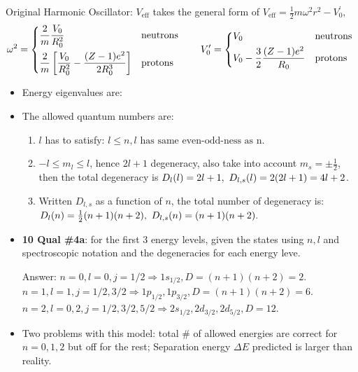 \documentclass{school-22.101-notes}
\begin{document}
Original Harmonic Oscillator: $V_{\mathrm{eff}}$ takes the general form of $V_{\mathrm{eff}} = \frac{1}{2} m \omega^2 r^2 - V_0^{\prime},$ 
  \begin{align}
    \omega^2 =
    \begin{dcases*}
      \frac{2}{m} \frac{V_0}{R_0^2}  & neutrons \\
      \frac{2}{m} \left[ \frac{V_0}{R_0^2} - \frac{(Z-1) e^2}{2 R_0^3} \right] & protons \\
    \end{dcases*}
    \fsp \fsp \fsp \fsp \fsp
    V_0^{\prime} = 
    \begin{dcases*}
      V_0 & neutrons \\
      V_0 - \frac{3}{2} \frac{(Z-1) e^2}{R_0} & protons \\
    \end{dcases*}
  \end{align}
\begin{itemize}
\item Energy eigenvalues are: 

\item The allowed quantum numbers are: 
  \begin{enumerate}
  \item $l$ has to satisfy: $\boxed{l \le n, l \mbox{ has same even-odd-ness as n.}}$
  \item $-l \le m_l \le l$, hence $2l+1$ degeneracy, also take into account $m_s = \pm \frac{1}{2}$, then the total degeneracy is $ D_l (l) = 2l+1, \mbox{ } D_{l,s} (l) = 2(2l+1) = 4l+2$.
  \item Written $D_{l,s}$ as a function of $n$, the total number of degeneracy is: 
    $ D_l (n) = \frac{1}{2} (n+1)(n+2), \mbox{ } D_{l,s} (n) = (n+1)(n+2).$
  \end{enumerate}
  
\item \textbf{10 Qual \#4a}: for the first 3 energy levels, given the states using $n, l$ and spectroscopic notation and the degeneracies for each energy leve. 
 
Answer: $n=0, l=0, j = 1/2 \Rightarrow 1s_{1/2}, D = (n+1)(n+2) = 2$. $n=1, l = 1, j = 1/2, 3/2 \Rightarrow 1p_{1/2}, 1p_{3/2}, D = (n+1)(n+2) = 6$. $n=2, l=0,2, j = 1/2, 3/2, 5/2 \Rightarrow 2s_{1/2}, 2d_{3/2}, 2d_{5/2}, D = 12$. 

\item Two problems with this model: total \# of allowed energies are correct for $n=0,1,2$ but off for the rest; Separation energy $\Delta E$ predicted is larger than reality.        
  \end{itemize}
\end{document}
